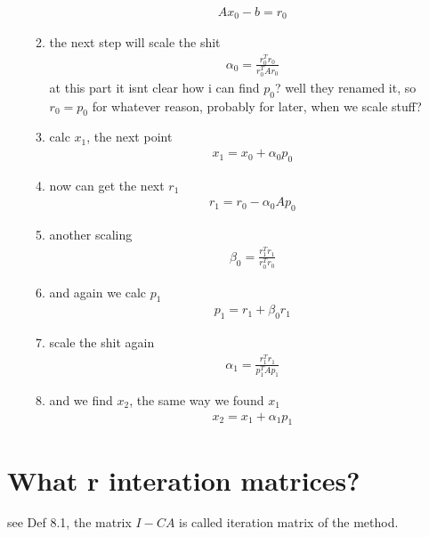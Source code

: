 \documentclass[]{scrartcl}
\newcommand{\<}{\trianglelefteq}
\begin{document}
\begin{itemize}
\begin{enumerate}
		\begin{align*}
			Ax_0 - b = r_0
		\end{align*}
		\item the next step will scale the shit
		\begin{align*}
			\alpha_0 = \frac{r^T_0 r_0}{r_0^T A r_0}
		\end{align*}
		at this part it isnt clear how i can find $p_0$? well they renamed it, so $r_0 = p_0$ for whatever reason, probably for later, when we scale stuff? %
		\item calc $x_1$, the next point
		\begin{align*}
			x_1 = x_0 + \alpha_0 p_0
		\end{align*}
		\item now can get the next $r_1$
		\begin{align*}
			r_1 = r_0 - \alpha_0 A p_0
		\end{align*}
		\item another scaling
		\begin{align*}
			\beta_0 = \frac{r_1^T r_1}{r^T_0 r_0}
		\end{align*}
		\item and again we calc $p_1$
		\begin{align*}
			p_1 = r_1 + \beta_0 r_1
		\end{align*}
		\item scale the shit again
		\begin{align*}
			\alpha_1 = \frac{r_1^T r_1}{p_1^T A p_1}
		\end{align*}
		\item and we find $x_2$, the same way we found $x_1$
		\begin{align*}
			x_2 = x_1 + \alpha_1 p_1
		\end{align*}
	\end{enumerate}
\end{itemize}

\section*{What r interation matrices?}
see Def 8.1, the matrix $I-CA$ is called iteration matrix of the method.
\end{document}
